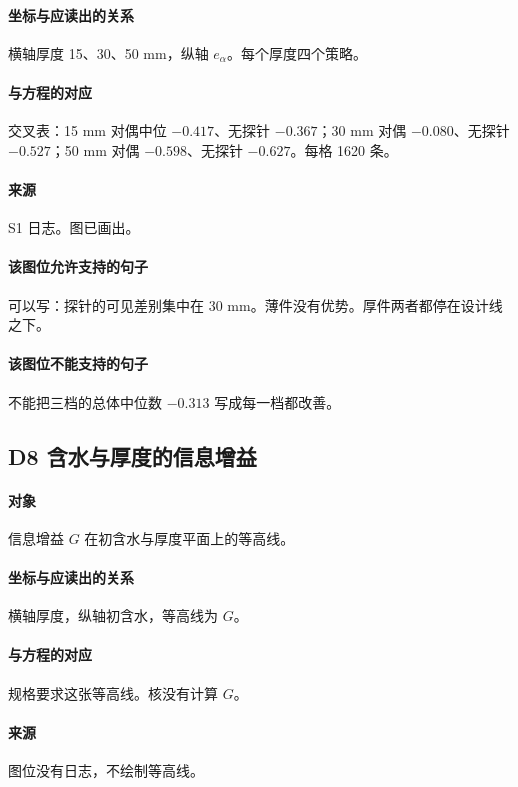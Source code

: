 \paragraph{坐标与应读出的关系}
横轴厚度 15、30、50 mm，纵轴 $e_\alpha$。每个厚度四个策略。

\paragraph{与方程的对应}
交叉表：15 mm 对偶中位 $-0.417$、无探针 $-0.367$；30 mm 对偶 $-0.080$、无探针 $-0.527$；50 mm 对偶 $-0.598$、无探针 $-0.627$。每格 1620 条。

\paragraph{来源}
S1 日志。图已画出。

\paragraph{该图位允许支持的句子}
可以写：探针的可见差别集中在 30 mm。薄件没有优势。厚件两者都停在设计线之下。

\paragraph{该图位不能支持的句子}
不能把三档的总体中位数 $-0.313$ 写成每一档都改善。

\subsection{D8 含水与厚度的信息增益}
\paragraph{对象}
信息增益 $G$ 在初含水与厚度平面上的等高线。

\paragraph{坐标与应读出的关系}
横轴厚度，纵轴初含水，等高线为 $G$。

\paragraph{与方程的对应}
规格要求这张等高线。核没有计算 $G$。

\paragraph{来源}
图位没有日志，不绘制等高线。

